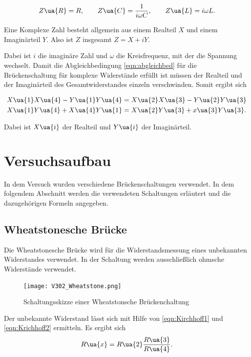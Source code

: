 \begin{equation*}
  Z\ua{R} = R, \qquad Z\ua{C} = \frac{1}{i\omega C}, \qquad Z\ua{L} = i\omega L.
\end{equation*}

Eine Komplexe Zahl besteht allgemein aus einem Realteil $X$ und einem Imaginärteil
$Y$. Also ist $Z$ insgesamt $Z = X + iY$.

Dabei ist $i$ die imaginäre Zahl und $\omega$ die Kreisfrequenz, mit der die
Spannung wechselt. Damit die Abgleichbedingung \eqref{eqn:abgleichbed} für die
Brückenschaltung für komplexe Widerstände erfüllt ist müssen der Realteil und der
Imaginärteil des Gesamtwiderstandes einzeln verschwinden. Somit ergibt sich

\begin{align}
  X\ua{1}X\ua{4} - Y\ua{1}Y\ua{4} &= X\ua{2}X\ua{3} - Y\ua{2}Y\ua{3}\label{eqn:RealteilAbgleichbed}\\
  X\ua{1}Y\ua{4} + X\ua{4}Y\ua{1} &= X\ua{2}Y\ua{3} + x\ua{3}Y\ua{3}\label{enq:ImaginärteilAbgleichbed}.
\end{align}

Dabei ist $X\ua{i}$ der Realteil und $Y\ua{i}$ der Imaginärteil.

\section{Versuchsaufbau}

In dem Versuch wurden verschiedene Brückenschaltungen verwendet. In dem folgendem
Abschnitt werden die verwendeten Schaltungen erläutert und die dazugehörigen
Formeln angegeben.

\subsection{Wheatstonesche Brücke}

Die Wheatstonesche Brücke wird für die Widerstandsmessung eines unbekannten
Widerstandes verwendet. In der Schaltung werden ausschließlich ohmsche Widerstände
verwendet.

\FloatBarrier
\begin{figure}
  \texttt{[image: V302\_Wheatstone.png]}
  \caption{Schaltungsskizze einer Wheatstonsche Brückenchaltung\cite{anleitung01}}
  \label{fig:Wheatstone}
\end{figure}
\FloatBarrier

Der unbekannte Widerstand lässt sich mit Hilfe von \eqref{eqn:Kirchhoff1} und
\eqref{eqn:Krichhoff2} ermitteln. Es ergibt sich
\begin{equation}
  \label{eqn:Wheatstone}
  R\ua{x} = R\ua{2}\frac{R\ua{3}}{R\ua{4}}.
\end{equation}

